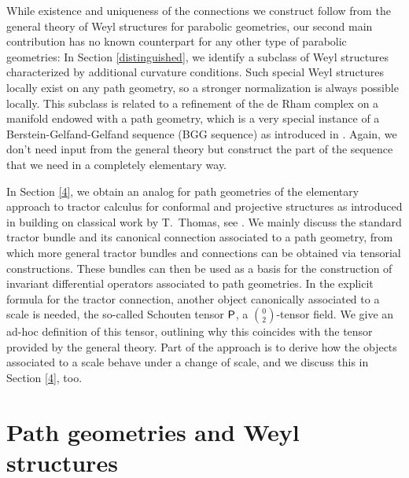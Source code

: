 \documentclass[11pt]{amsart}
\def\Rho{\mbox{\textsf{P}}}
\numberwithin{proposition}{section}
\numberwithin{equation}{section}
\begin{document}
While existence and uniqueness of the connections we construct follow from the general theory of Weyl structures for parabolic geometries, our second main contribution has no known counterpart for any other type of parabolic geometries: In Section \ref{distinguished}, we identify a subclass of Weyl structures characterized by additional curvature conditions. Such special Weyl structures locally exist on any path geometry, so a stronger normalization is always possible locally. This subclass is related to a refinement of the de Rham complex on a manifold endowed with a path geometry, which is a very special instance of a Berstein-Gelfand-Gelfand sequence (BGG sequence) as introduced in \cite{CSS-BGG}. Again, we don't need input from the general theory but construct the part of the sequence that we need in a completely elementary way. 

In Section \ref{4}, we obtain an analog for path geometries of the elementary approach to tractor calculus for conformal and projective structures as introduced in \cite{BEG} building on classical work by T.\ Thomas, see \cite{Thomas}. We mainly discuss the standard tractor bundle and its canonical connection associated to a path geometry, from which more general tractor bundles and connections can be obtained via tensorial constructions. These bundles can then be used as a basis for the construction of invariant differential operators associated to path geometries. In the explicit formula for the tractor connection, another object canonically associated to a scale is needed, the so-called Schouten tensor $\Rho$, a $\binom02$-tensor field. We give an ad-hoc definition of this tensor, outlining why this coincides with the tensor provided by the general theory. Part of the approach is to derive how the objects associated to a scale behave under a change of scale, and we discuss this in Section \ref{4}, too.   

\section{Path geometries and Weyl structures}\label{2}
\end{document}
